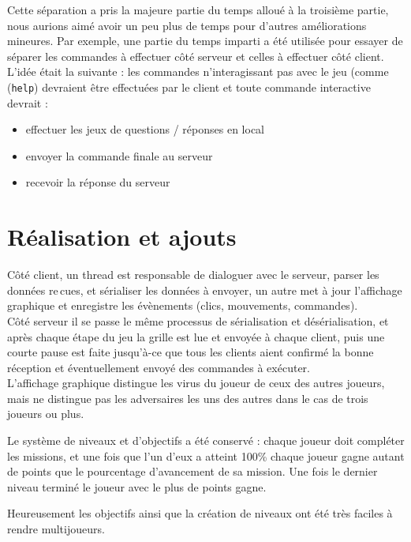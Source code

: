 \documentclass[a4paper,french]{article}
\begin{document}
Cette séparation a pris la majeure partie du temps alloué à la troisième partie,
nous aurions aimé avoir un peu plus de temps pour d'autres améliorations mineures.
Par exemple, une partie du temps imparti a été utilisée pour essayer de séparer les commandes à effectuer côté serveur et celles
à effectuer côté client. L'idée était la suivante : les commandes n'interagissant pas avec le jeu (comme
(\texttt{help}) devraient être effectuées par le client et toute commande interactive devrait :
\begin{itemize}
	\item effectuer les jeux de questions / réponses en local
	\item envoyer la commande finale au serveur
	\item recevoir la réponse du serveur
\end{itemize}



\section{Réalisation et ajouts}

Côté client, un thread est responsable de dialoguer avec le serveur, parser les données re\,cues, et
sérialiser les données à envoyer, un autre met à jour l'affichage graphique et enregistre les
évènements (clics, mouvements, commandes).\\

Côté serveur il se passe le même processus de sérialisation et désérialisation, et après chaque
étape du jeu la grille est lue et envoyée à chaque client, puis une courte pause est faite jusqu'à-ce que
tous les clients aient confirmé la bonne réception et éventuellement envoyé des commandes à exécuter.\\

L'affichage graphique distingue les virus du joueur de ceux des autres joueurs, mais ne distingue pas les
adversaires les uns des autres dans le cas de trois joueurs ou plus.

Le système de niveaux et d'objectifs a été conservé : chaque joueur doit compléter les missions,
et une fois que l'un d'eux a atteint 100\% chaque joueur gagne autant de points que le pourcentage d'avancement
de sa mission. Une fois le dernier niveau terminé le joueur avec le plus de points gagne.

Heureusement les objectifs ainsi que la création de niveaux ont été très faciles à rendre multijoueurs.\\
\end{document}
